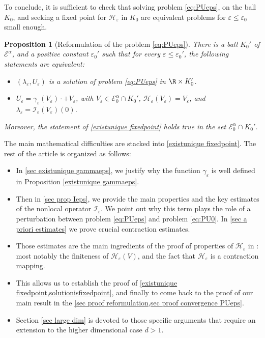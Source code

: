 \documentclass[10pt]{amsart}
\let\mathcal\mathscr
\newcommand{\cI}{\mathcal{I}}
\theoremstyle{plain}
\newtheorem{prop}[thm]{Proposition}
\theoremstyle{definition}
\renewcommand{\H}{\mathcal{H}_\eps}
\let\eps\varepsilon
\newcommand{\Ea}{\mathcal{E}^\alpha}
\newcommand{\Eaz}{\mathcal{E}^\alpha_0}
\begin{document}
To conclude, it is sufficient to check that solving problem \eqref{eq:PUeps}, on the ball $K_0$, and seeking a fixed point for $\H$ in $K_0$ are equivalent problems for $\eps\leq \eps_0$ small enough.

\begin{prop}[Reformulation of the problem \eqref{eq:PUeps}]\label{solutionisfixedpoint}
There is a ball $K_0'$ of $\Ea$, and a positive constant $\eps_0'$ such that for every $\eps\leq \eps_0'$, the following statements are equivalent:
\begin{itemize}
\item $(\lambda_\eps,U_\eps)$ is a solution of problem \eqref{eq:PUeps} in $\R \times K_0'$.

\item $U_\eps= \gamma_\eps(V_\eps) \cdot + V_\eps$, with $V_\eps \in \Eaz\cap K_0'$, $\H(V_\eps) = V_\eps$, and $\lambda_\eps = \cI_\eps(V_\eps)(0)$.
\end{itemize}
Moreover, the statement of \cref{existunique fixedpoint} holds true in the set $\Eaz\cap K_0'$.
\end{prop}

The main mathematical difficulties are stacked into \cref{existunique fixedpoint}.
The rest of the article is organized as follows:
\begin{itemize}
\item In \cref{sec existunique gammaeps}, we justify why the function $\gamma_\eps$ is well defined in Proposition \ref{existunique gammaeps}.

\item Then in \cref{sec prop Ieps}, we provide the main properties and the key estimates of the nonlocal operator $\cI_\eps$. We point out why this term plays the role of a perturbation between problem \eqref{eq:PUeps} and problem \eqref{eq:PU0}. In \cref{sec a priori estimates} we prove crucial contraction estimates.

\item Those estimates are the main ingredients of the proof of properties of $\H$ in : most notably the finiteness of $\H(V)$, and the fact that $\H$ is a contraction mapping.

\item This allows us to establish the proof of \cref{existunique fixedpoint,solutionisfixedpoint}, and finally to come back to the proof of our main result  in the \cref{sec proof reformulation,sec proof convergence PUeps}.

\item Section \ref{sec large dim} is devoted to those specific arguments that require an extension to the higher dimensional case $d>1$.
\end{itemize}
\end{document}
